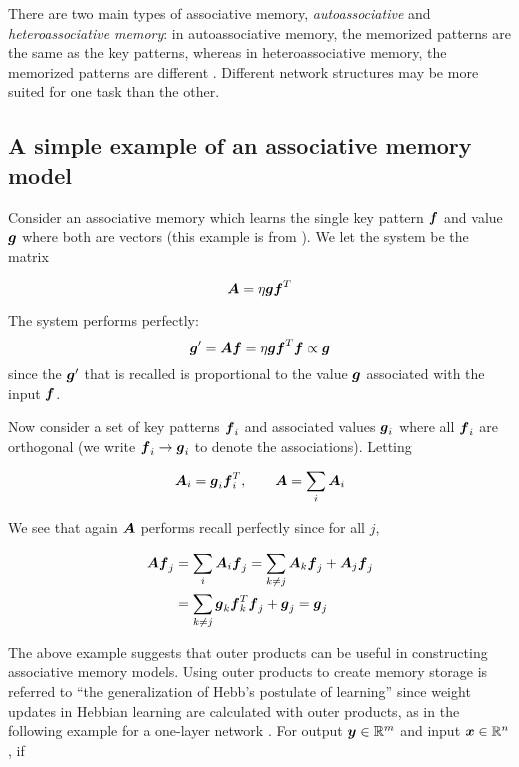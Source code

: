 There are two main types of associative memory, \emph{autoassociative} and \emph{heteroassociative memory}: in autoassociative memory, the memorized patterns are the same as the key patterns, whereas in heteroassociative memory, the memorized patterns are different \cite[p. 38]{Haykin:2009:NNC:1213811}. Different network structures may be more suited for one task than the other.

\subsection{A simple example of an associative memory model}

Consider an associative memory which learns the single key pattern $\boldsymbol{f}$ and value $\boldsymbol{g}$ where both are vectors (this example is from \cite[p. 163-165]{Anderson95}). We let the system be the matrix

\begin{equation*}
\boldsymbol{A} = \eta \boldsymbol{g}\boldsymbol{f}^T
\end{equation*}

The system performs perfectly:
%
\begin{equation*}
\boldsymbol{g}^\prime = \boldsymbol{A}\boldsymbol{f} = \eta\boldsymbol{g}\boldsymbol{f}^T\boldsymbol{f} \propto \boldsymbol{g}
\end{equation*}
%
since the $\boldsymbol{g}^\prime$ that is recalled is proportional to the value $\boldsymbol{g}$ associated with the input $\boldsymbol{f}$.

Now consider a set of key patterns $\boldsymbol{f}_i$ and associated values $\boldsymbol{g}_i$ where all $\boldsymbol{f}_i$ are orthogonal (we write $\boldsymbol{f}_i \rightarrow \boldsymbol{g}_i$ to denote the associations). Letting

\begin{equation*}
\boldsymbol{A}_i = \boldsymbol{g}_i \boldsymbol{f}_i^T, \qquad \boldsymbol{A} = \sum_{i} \boldsymbol{A}_i
\end{equation*}

We see that again $\boldsymbol{A}$ performs recall perfectly since for all $j$,

\begin{align*}
  \boldsymbol{A}\boldsymbol{f}_j & = \sum_{i}\boldsymbol{A}_i \boldsymbol{f}_j = \sum_{k \neq j} \boldsymbol{A}_k \boldsymbol{f}_j + \boldsymbol{A}_j\boldsymbol{f}_j \\
  & = \sum_{k \neq j} \boldsymbol{g}_k \boldsymbol{f}_k^T \boldsymbol{f}_j + \boldsymbol{g}_j = \boldsymbol{g}_j
\end{align*}

The above example suggests that outer products can be useful in constructing associative memory models. Using outer products to create memory storage is referred to ``the generalization of Hebb's postulate of learning'' \cite[p. 698]{Haykin:2009:NNC:1213811} since weight updates in Hebbian learning are calculated with outer products, as in the following example for a one-layer network \cite[p. 39-40]{fyfe2000}. For output $\boldsymbol{y} \in \mathbb{R}^m$ and input $\boldsymbol{x} \in \mathbb{R}^n$, if

